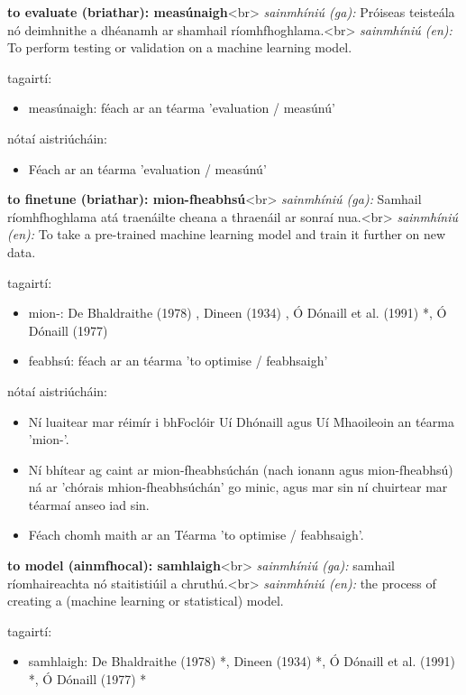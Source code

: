 \documentclass{article}
\begin{document}
\textbf{to evaluate (briathar): measúnaigh}<br>
\textit{sainmhíniú (ga):} Próiseas teisteála nó deimhnithe a dhéanamh ar shamhail ríomhfhoghlama.<br>
\textit{sainmhíniú (en):} To perform testing or validation on a machine learning model.

tagairtí:
\begin{itemize}
	\item measúnaigh: féach ar an téarma 'evaluation / measúnú'
\end{itemize}

nótaí aistriúcháin:
\begin{itemize}
	\item Féach ar an téarma 'evaluation / measúnú'
\end{itemize}


\textbf{to finetune (briathar): mion-fheabhsú}<br>
\textit{sainmhíniú (ga):} Samhail ríomhfhoghlama atá traenáilte cheana a thraenáil ar sonraí nua.<br>
\textit{sainmhíniú (en):} To take a pre-trained machine learning model and train it further on new data.

tagairtí:
\begin{itemize}
	\item mion-: De Bhaldraithe (1978) \cite{de-bhaldraithe}, Dineen (1934) \cite{dineen}, Ó Dónaill et al. (1991) \cite{focloir-beag}*, Ó Dónaill (1977) \cite{odonaill}
	\item feabhsú: féach ar an téarma 'to optimise / feabhsaigh'
\end{itemize}

nótaí aistriúcháin:
\begin{itemize}
	\item Ní luaitear mar réimír i bhFoclóir Uí Dhónaill agus Uí Mhaoileoin an téarma 'mion-'.
	\item Ní bhítear ag caint ar mion-fheabhsúchán (nach ionann agus mion-fheabhsú) ná ar 'chórais mhion-fheabhsúchán' go minic, agus mar sin ní chuirtear mar téarmaí anseo iad sin.
	\item Féach chomh maith ar an Téarma 'to optimise / feabhsaigh'.
\end{itemize}


\textbf{to model (ainmfhocal): samhlaigh}<br>
\textit{sainmhíniú (ga):} samhail ríomhaireachta nó staitistiúil a chruthú.<br>
\textit{sainmhíniú (en):} the process of creating a (machine learning or statistical) model.

tagairtí:
\begin{itemize}
	\item samhlaigh: De Bhaldraithe (1978) \cite{de-bhaldraithe}*, Dineen (1934) \cite{dineen}*, Ó Dónaill et al. (1991) \cite{focloir-beag}*, Ó Dónaill (1977) \cite{odonaill}*
\end{itemize}
\end{document}
